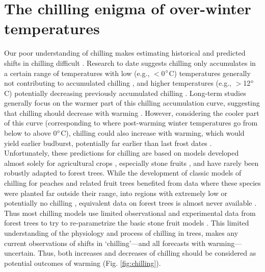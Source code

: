 \documentclass[11pt]{article}
\begin{document}
\section{The chilling enigma of over-winter temperatures}
Our poor understanding of chilling makes estimating historical and predicted shifts in chilling difficult \citep{chuine2016}. Research to date suggests chilling only accumulates in a certain range of temperatures with low (e.g., $<$0$\degree$C) temperatures generally not contributing to accumulated chilling \citep[but see][]{baum2021}, and higher temperatures (e.g., $>$12$\degree$C) potentially decreasing previously accumulated chilling \citep[see Fig. \ref{fig:chilling} and][]{richardson1974,fishman1987}. Long-term studies generally focus on the warmer part of this chilling accumulation curve, suggesting that chilling should decrease with warming \citep{fu2015,piao2017,gauzere2019}.  However, considering the cooler part of this curve (corresponding to where post-warming winter temperatures go from below to above 0$\degree$C), chilling could also increase with warming, which would yield earlier budburst, potentially far earlier than last frost dates \citep[][]{guy2014}. \\

Unfortunately, these predictions for chilling are based on models developed almost solely for agricultural crops \citep[but see][]{harrington2015}, especially stone fruits \citep[even for stone fruits, there have been few advances on the possible mechanisms and pathways that underlie these models over decades of research, see][]{erez1971,Rageau}, and have rarely been robustly adapted to forest trees. While the development of classic models of chilling for peaches and related fruit trees benefited from data where these species were planted far outside their range, into regions with extremely low or potentially no chilling \citep{erez1971,richardson1974}, equivalent data on forest trees is almost never available \citep{dennis2003}. Thus most chilling models use limited observational and experimental data from forest trees to try to re-parametrize the basic stone fruit models \citep{Chuine2000,chuine2016}. This limited understanding of the physiology and process of chilling in trees, makes any current observations of shifts in `chilling'---and all forecasts with warming---uncertain. Thus, both increases and decreases of chilling should be considered as potential outcomes of warming (Fig. \ref{fig:chilling}). \\
\end{document}
